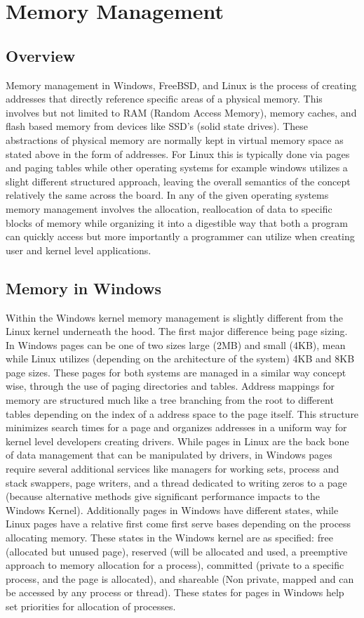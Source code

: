 \section{Memory Management}
\subsection{Overview}
Memory management in Windows, FreeBSD, and Linux is the process of creating addresses that directly reference specific areas of a physical memory. This involves but not limited to RAM (Random Access Memory), memory caches, and flash based memory from devices like SSD's (solid state drives)\cite{Whatisme93:online}. These abstractions of physical memory are normally kept in virtual memory space as stated above in the form of addresses. For Linux this is typically done via pages and paging tables while other operating systems for example windows utilizes a slight different structured approach, leaving the overall semantics of the concept relatively the same across the board. In any of the given operating systems memory management involves the allocation, reallocation of data to specific blocks of memory while organizing it into a digestible way that both a program can quickly access but more importantly a programmer can utilize when creating user and kernel level applications.
\subsection{Memory in Windows}
Within the Windows kernel memory management is slightly different from the Linux kernel underneath the hood. The first major difference being page sizing. In Windows pages can be one of two sizes large (2MB) and small (4KB)\cite{windowsbookpt1}, mean while Linux utilizes (depending on the architecture of the system) 4KB and 8KB page sizes\cite{Linux_book}. These pages for both systems are managed in a similar way concept wise, through the use of paging directories and tables. Address mappings for memory are structured much like a tree branching from the root to different tables depending on the index of a address space to the page itself. This structure minimizes search times for a page and organizes addresses in a uniform way for kernel level developers creating drivers. While pages in Linux are the back bone of data management that can be manipulated by drivers, in Windows pages require several additional services like managers for working sets, process and stack swappers, page writers, and a thread dedicated to writing zeros to a page (because alternative methods give significant performance impacts to the Windows Kernel). Additionally pages in Windows have different states, while Linux pages have a relative first come first serve bases depending on the process allocating memory. These states in the Windows kernel are as specified: free (allocated but unused page), reserved (will be allocated and used, a preemptive approach to memory allocation for a process), committed (private to a specific process, and the page is allocated), and shareable (Non private, mapped and can be accessed by any process or thread). These states for pages in Windows help set priorities for allocation of processes.
